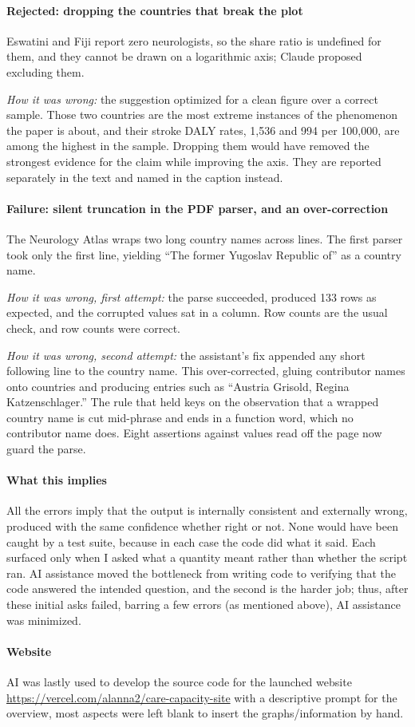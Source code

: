 \documentclass[9pt,twoside]{pnas-new}
\begin{document}
\paragraph{Rejected: dropping the countries that break the plot} Eswatini and
Fiji report zero neurologists, so the share ratio is undefined for them, and they
cannot be drawn on a logarithmic axis; Claude proposed excluding them.

\emph{How it was wrong:} the suggestion optimized for a clean figure over a
correct sample. Those two countries are the most extreme instances of the
phenomenon the paper is about, and their stroke DALY rates, 1{,}536 and 994 per
100{,}000, are among the highest in the sample. Dropping them would have removed
the strongest evidence for the claim while improving the axis. They are reported
separately in the text and named in the caption instead.


\paragraph{Failure: silent truncation in the PDF parser, and an over-correction}
The Neurology Atlas wraps two long country names across lines. The first parser
took only the first line, yielding ``The former Yugoslav Republic of'' as a
country name.

\emph{How it was wrong, first attempt:} the parse succeeded, produced 133 rows
as expected, and the corrupted values sat in a column. Row
counts are the usual check, and row counts were correct.

\emph{How it was wrong, second attempt:} the assistant's fix appended any short
following line to the country name. This over-corrected, gluing contributor
names onto countries and producing entries such as ``Austria Grisold, Regina
Katzenschlager.'' The rule that held keys on the observation that a wrapped
country name is cut mid-phrase and ends in a function word, which no contributor
name does. Eight assertions against values read off the page now guard the
parse.

\paragraph{What this implies} All the errors imply that the output is internally
consistent and externally wrong, produced with the same confidence whether right
or not. None would have been caught by a test suite, because in each case the
code did what it said. Each surfaced only when I asked what a quantity
meant rather than whether the script ran. AI assistance moved the
bottleneck from writing code to verifying that the code answered the intended
question, and the second is the harder job; thus, after these initial asks failed, barring a few errors (as mentioned above), AI assistance was minimized.

\paragraph{Website} AI was lastly used to develop the source code for the launched website \url{https://vercel.com/alanna2/care-capacity-site} with a descriptive prompt for the overview, most aspects were left blank to insert the graphs/information by hand.
\end{document}
